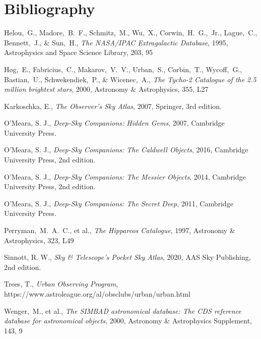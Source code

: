 \chapter*{Bibliography}

Helou,~G.,  Madore,~B.~F.,  Schmitz,~M.,  Wu,~X., Corwin,~H.~G.,~Jr.,  Lague,~C., Bennett,~J., \& Sun,~H., \emph{The NASA/IPAC Extragalactic Database}, 1995, Astrophysics and Space Science Library, 203, 95

Høg,~E., Fabricius,~C., Makarov,~V.~V., Urban,~S., Corbin,~T., Wycoff,~G., Bastian,~U., Schwekendiek,~P., \& Wicenec,~A., \emph{The Tycho-2 Catalogue of the 2.5 million brightest stars}, 2000, Astronomy \& Astrophysics, 355, L27

Karkoschka, E., \emph{The Observer’s Sky Atlas},  2007, Springer, 3rd edition.

O’Meara, S. J., \emph{Deep-Sky Companions: Hidden Gems},  2007, Cambridge University Press.

O’Meara, S. J., \emph{Deep-Sky Companions: The Caldwell Objects},  2016, Cambridge University Press, 2nd edition.

O’Meara, S. J., \emph{Deep-Sky Companions: The Messier Objects},  2014, Cambridge University Press, 2nd edition.

O’Meara, S. J., \emph{Deep-Sky Companions: The Secret Deep},  2011, Cambridge University Press.

Perryman,~M.~A.~C., et al., \emph{The Hipparcos Catalogue}, 1997,  Astronomy \& Astrophysics, 323, L49

Sinnott, R. W., \emph{Sky \& Telescope’s Pocket Sky Atlas}, 2020, AAS Sky Publishing, 2nd edition.

Trees, T., \emph{Urban Observing Program}, \\
https://www.astroleague.org/al/obsclubs/urban/urban.html

Wenger,~M., et al., \emph{The SIMBAD astronomical database: The CDS reference database for astronomical objects}, 2000, Astronomy \& Astrophysics Supplement, 143, 9
